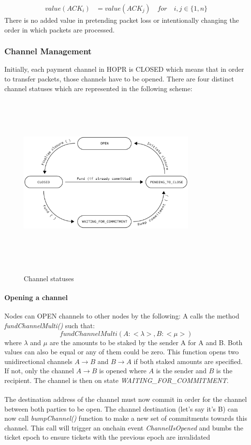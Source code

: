 \begin{align}
 value ( ACK_i )  &  =value ( ACK_j ) \quad for \quad i,j\in \{1,n\}
\end{align}
There is no added value in pretending packet loss or intentionally changing the order in which packets are processed.

\subsubsection{Channel Management}
Initially, each payment channel in HOPR is CLOSED which means that in order to transfer packets, those channels have to be opened. There are four distinct channel statuses which are represented in the following scheme:

\begin{figure}[H]
    \centering
    \includegraphics[width=9cm,height=9cm,keepaspectratio]{../yellowpaper/images/states1.png}
\label{fig:channel statuses}
    \caption{Channel statuses}
\end{figure}

\paragraph{Opening a channel} Nodes can OPEN channels to other nodes by the following:
A calls the method \textit{fundChannelMulti()} such that:
$$fundChannelMulti(A: <\lambda>, B:<\mu> )$$ where $\lambda$ and $\mu$ are the amounts to be staked by the sender A for A and B. Both values can also be equal or any of them could be zero. This function opens two unidirectional channels $A\rightarrow B$ and $B\rightarrow A$ if both staked amounts are specified. If not, only the channel $A\rightarrow B$ is opened where $A$ is the sender and $B$ is the recipient.
The channel is then on state \textit{WAITING\_FOR\_COMMITMENT}.
\\~\\The destination address of the channel must now commit in order for the channel between both parties to be open.
The channel destination (let's say it's B) can now call \textit{bumpChannel()} function to make a new set of commitments towards this channel. This call will trigger an onchain event \textit{ChannelIsOpened} and bumbs the ticket epoch to ensure tickets with the previous epoch are invalidated

